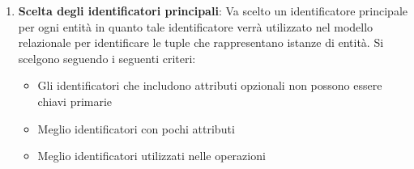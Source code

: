 \documentclass[a4paper,twoside]{article}
\begin{document}
\begin{enumerate}
\begin{itemize}
      \item \textbf{Attributo composto}: si può procedere in tre modi, a seconda
        di come viene usato dalle operazioni:
        \begin{enumerate}
          \item \textbf{Appiattimento} (caso più frequente): si eliminano
            l'attributo composto e si portano i suoi componenti come attributi
            semplici dell'entità (es. \textit{Indirizzo} composto da
            \textit{Via}, \textit{Civico}, \textit{CAP} diventa tre attributi
            distinti dell'entità).
          \item \textbf{Accorpamento in un unico attributo}: si mantiene un solo
            attributo che concatena i componenti; conviene solo se le operazioni
            non accedono mai ai singoli componenti separatamente.
          \item \textbf{Sostituzione con una nuova entità}: si trasforma
            l'attributo composto in un'entità collegata da una relazione;
            conviene quando i componenti hanno vita propria o sono condivisi.
        \end{enumerate}
    \end{itemize}
    \textbf{Nota}: se un attributo è \textbf{contemporaneamente composto e
    multivalore} (es. una lista di indirizzi), va necessariamente trasformato in
    una nuova entità.

  \item \textbf{Scelta degli identificatori principali}:
    Va scelto un identificatore principale per ogni entità in
    quanto tale identificatore verrà utilizzato nel modello
    relazionale per identificare le tuple che rappresentano
    istanze di entità. Si scelgono seguendo i seguenti criteri:
    \begin{itemize}
      \item Gli identificatori che includono attributi opzionali non
        possono essere chiavi primarie
      \item Meglio identificatori con pochi attributi
      \item Meglio identificatori utilizzati nelle operazioni
    \end{itemize}
\end{enumerate}
\end{document}
